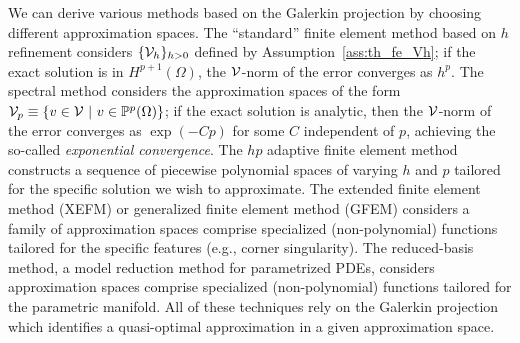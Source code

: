 We can derive various methods based on the Galerkin projection by choosing different approximation spaces. The ``standard'' finite element method based on $h$ refinement considers $\{ \mathcal{V}_h \}_{h > 0}$ defined by Assumption~\ref{ass:th_fe_Vh}; if the exact solution is in $H^{p+1}(\Omega)$, the $\mathcal{V}$-norm of the error converges as $h^p$. The spectral method considers the approximation spaces of the form $\mathcal{V}_p \equiv \{ v \in \mathcal{V} \ | \ v \in \mathbb{P}^p(\Omega) \}$; if the exact solution is analytic, then the $\mathcal{V}$-norm of the error converges as $\exp(-Cp)$ for some $C$ independent of $p$, achieving the so-called \emph{exponential convergence}. The $hp$ adaptive finite element method constructs a sequence of piecewise polynomial spaces of varying $h$ and $p$ tailored for the specific solution we wish to approximate. The extended finite element method (XEFM) or generalized finite element method (GFEM) considers a family of approximation spaces comprise specialized (non-polynomial) functions tailored for the specific features (e.g., corner singularity).  The reduced-basis method, a model reduction method for parametrized PDEs, considers approximation spaces comprise specialized (non-polynomial) functions tailored for the parametric manifold.  All of these techniques rely on the Galerkin projection which identifies a quasi-optimal approximation in a given approximation space.

